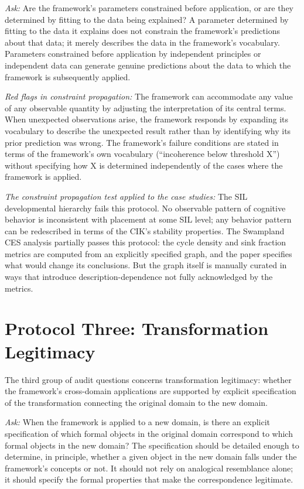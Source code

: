 \documentclass[12pt, openright, twoside]{book}
\begin{document}
\textit{Ask:} Are the framework's parameters constrained before application,
or are they determined by fitting to the data being explained? A parameter
determined by fitting to the data it explains does not constrain the
framework's predictions about that data; it merely describes the data in
the framework's vocabulary. Parameters constrained before application by
independent principles or independent data can generate genuine predictions
about the data to which the framework is subsequently applied.

\textit{Red flags in constraint propagation:} The framework can accommodate
any value of any observable quantity by adjusting the interpretation of its
central terms. When unexpected observations arise, the framework responds
by expanding its vocabulary to describe the unexpected result rather than
by identifying why its prior prediction was wrong. The framework's failure
conditions are stated in terms of the framework's own vocabulary (``incoherence
below threshold X'') without specifying how X is determined independently
of the cases where the framework is applied.

\textit{The constraint propagation test applied to the case studies:}
The SIL developmental hierarchy fails this protocol. No observable pattern
of cognitive behavior is inconsistent with placement at some SIL level;
any behavior pattern can be redescribed in terms of the CIK's stability
properties. The Swampland CES analysis partially passes this protocol:
the cycle density and sink fraction metrics are computed from an explicitly
specified graph, and the paper specifies what would change its conclusions.
But the graph itself is manually curated in ways that introduce description-dependence
not fully acknowledged by the metrics.

\section{Protocol Three: Transformation Legitimacy}

The third group of audit questions concerns transformation legitimacy:
whether the framework's cross-domain applications are supported by
explicit specification of the transformation connecting the original
domain to the new domain.

\textit{Ask:} When the framework is applied to a new domain, is there
an explicit specification of which formal objects in the original domain
correspond to which formal objects in the new domain? The specification
should be detailed enough to determine, in principle, whether a given
object in the new domain falls under the framework's concepts or not.
It should not rely on analogical resemblance alone; it should specify
the formal properties that make the correspondence legitimate.
\end{document}
